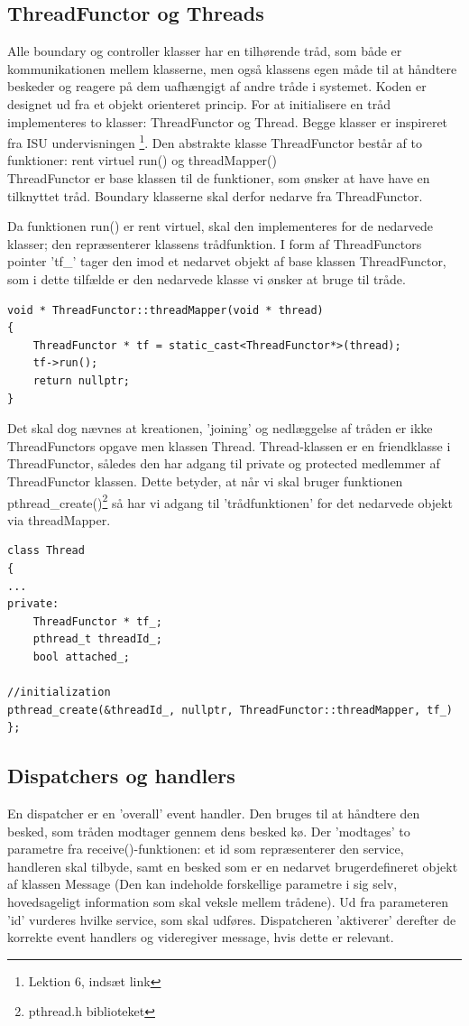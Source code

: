 \documentclass[Softwaredesign/Softwaredesign_main.tex]{subfiles}
\begin{document}
\subsection{ThreadFunctor og Threads}
Alle boundary og controller klasser har en tilhørende tråd, som både er kommunikationen mellem klasserne, men også klassens egen måde til at håndtere beskeder og reagere på dem uafhængigt af andre tråde i systemet. Koden er designet ud fra et objekt orienteret princip. For at initialisere en tråd implementeres to klasser: ThreadFunctor og Thread. Begge klasser er inspireret fra ISU undervisningen \footnote{Lektion 6, indsæt link}. Den abstrakte klasse ThreadFunctor består af to funktioner: rent virtuel run() og threadMapper()
\\ThreadFunctor er base klassen til de funktioner, som ønsker at have have en tilknyttet tråd. Boundary klasserne skal derfor nedarve fra ThreadFunctor. 

Da funktionen run() er rent virtuel, skal den implementeres for de nedarvede klasser; den repræsenterer klassens trådfunktion. I form af ThreadFunctors pointer 'tf\_' tager den imod et nedarvet objekt af base klassen ThreadFunctor, som i dette tilfælde er den nedarvede klasse vi ønsker at bruge til tråde. 
\begin{lstlisting}[caption={threadMapper funktion},label={lst:threadmap}]
void * ThreadFunctor::threadMapper(void * thread)
{
	ThreadFunctor * tf = static_cast<ThreadFunctor*>(thread);
	tf->run();
	return nullptr;
}
\end{lstlisting}
Det skal dog nævnes at kreationen, 'joining' og nedlæggelse af tråden er ikke ThreadFunctors opgave men klassen Thread. Thread-klassen er en friendklasse i ThreadFunctor, således den har adgang til private og protected medlemmer af ThreadFunctor klassen. Dette betyder, at når vi skal bruger funktionen pthread\_create()\footnote{pthread.h biblioteket} så har vi adgang til 'trådfunktionen' for det nedarvede objekt via threadMapper. 
\begin{lstlisting}[caption={Udsnit af Thread-klasse},label={lst:thread}]
class Thread
{
...
private:
	ThreadFunctor * tf_;
	pthread_t threadId_;
	bool attached_;
	
//initialization 
pthread_create(&threadId_, nullptr, ThreadFunctor::threadMapper, tf_)
};
\end{lstlisting}
\subsection{Dispatchers og handlers}
En dispatcher er en 'overall' event handler. Den bruges til at håndtere den besked, som tråden modtager gennem dens besked kø. Der 'modtages' to parametre fra receive()-funktionen: et id som repræsenterer den service, handleren skal tilbyde, samt en besked som er en nedarvet brugerdefineret objekt af klassen Message (Den kan indeholde forskellige parametre i sig selv, hovedsageligt information som skal veksle mellem trådene). Ud fra parameteren 'id' vurderes hvilke service, som skal udføres. Dispatcheren 'aktiverer' derefter de korrekte event handlers og videregiver message, hvis dette er relevant. 
\end{document}
